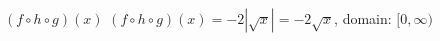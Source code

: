 {$(f\circ h \circ g)(x)$}
{$(f\circ h \circ g)(x) = -2|\sqrt{x}| = -2\sqrt{x}$, domain: $[0,\infty)$}